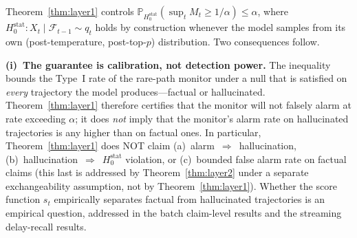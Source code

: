 \documentclass[runningheads]{llncs}
\newcommand{\Hnull}{H_0^{\text{stat}}}
\begin{document}
\begin{remark}
\label{rem:theorem1-scope}
Theorem~\ref{thm:layer1} controls
$\mathbb{P}_{\Hnull}(\sup_t M_t \ge 1/\alpha) \le \alpha$, where
$\Hnull: X_t \mid \mathcal{F}_{t-1} \sim q_t$ holds by construction
whenever the model samples from its own (post-temperature,
post-top-$p$) distribution. Two consequences follow.

\textbf{(i)~The guarantee is calibration, not detection power.}
The inequality bounds the Type~I rate of the rare-path monitor under
a null that is satisfied on \emph{every} trajectory the model
produces---factual or hallucinated. Theorem~\ref{thm:layer1}
therefore certifies that the monitor will not falsely alarm at rate
exceeding $\alpha$; it does \emph{not} imply that the monitor's alarm
rate on hallucinated trajectories is any higher than on factual ones.
In particular, Theorem~\ref{thm:layer1} does NOT claim
(a)~alarm~$\Rightarrow$~hallucination,
(b)~hallucination~$\Rightarrow$~$\Hnull$ violation, or
(c)~bounded false alarm rate on factual claims (this last is
addressed by Theorem~\ref{thm:layer2} under a separate
exchangeability assumption, not by Theorem~\ref{thm:layer1}).
Whether the score function $s_t$ empirically separates factual from
hallucinated trajectories is an empirical question, addressed in the
batch claim-level results and the streaming delay-recall results.


\end{remark}
\end{document}
